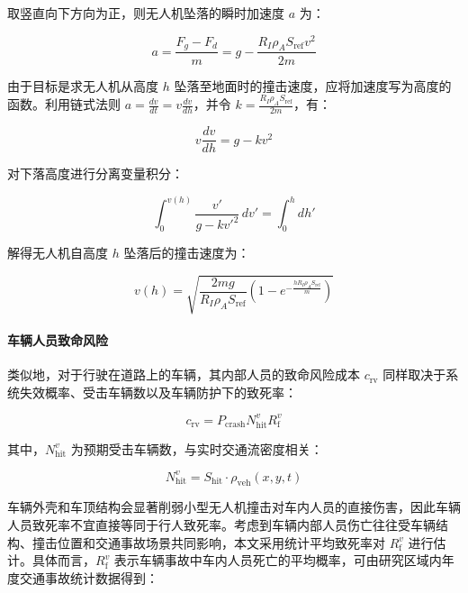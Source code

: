 取竖直向下方向为正，则无人机坠落的瞬时加速度 $a$ 为：

\begin{equation}
a = \frac{F_g - F_d}{m}
= g - \frac{R_I \rho_A S_{\mathrm{ref}} v^2}{2m}
\label{eq:acceleration}
\end{equation}

由于目标是求无人机从高度 $h$ 坠落至地面时的撞击速度，应将加速度写为高度的函数。利用链式法则 $a=\frac{dv}{dt}=v\frac{dv}{dh}$，并令 $k=\frac{R_I \rho_A S_{\mathrm{ref}}}{2m}$，有：

\begin{equation}
v\frac{dv}{dh} = g - k v^2
\label{eq:velocity_height_ode}
\end{equation}

对下落高度进行分离变量积分：

\begin{equation}
\int_{0}^{v(h)} \frac{v'}{g-kv'^2}\,dv'
= \int_{0}^{h} dh'
\label{eq:impact_velocity_integral}
\end{equation}

解得无人机自高度 $h$ 坠落后的撞击速度为：

\begin{equation}
v(h) =
\sqrt{\frac{2mg}{R_I \rho_A S_{\mathrm{ref}}}
\left(1 - e^{-\frac{h R_I \rho_A S_{\mathrm{ref}}}{m}}\right)}
\label{eq:impact_velocity}
\end{equation}

\paragraph{车辆人员致命风险}
类似地，对于行驶在道路上的车辆，其内部人员的致命风险成本 $c_{\mathrm{rv}}$ 同样取决于系统失效概率、受击车辆数以及车辆防护下的致死率：

\begin{equation}
c_{\mathrm{rv}} = P_{\mathrm{crash}} N_{\mathrm{hit}}^v R_{\mathrm{f}}^v
\label{eq:vehicle_fatality}
\end{equation}

其中，$N_{\mathrm{hit}}^v$ 为预期受击车辆数，与实时交通流密度相关：

\begin{equation}
N_{\mathrm{hit}}^v = S_{\mathrm{hit}} \cdot \rho_{\mathrm{veh}}(x,y,t)
\label{eq:vehicle_hit_count}
\end{equation}

车辆外壳和车顶结构会显著削弱小型无人机撞击对车内人员的直接伤害，因此车辆人员致死率不宜直接等同于行人致死率。考虑到车辆内部人员伤亡往往受车辆结构、撞击位置和交通事故场景共同影响，本文采用统计平均致死率对 $R_{\mathrm{f}}^v$ 进行估计。具体而言，$R_{\mathrm{f}}^v$ 表示车辆事故中车内人员死亡的平均概率，可由研究区域内年度交通事故统计数据得到：

